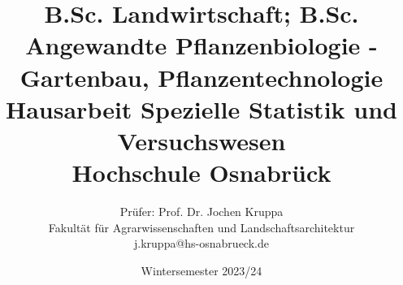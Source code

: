\setlength{\parindent}{0cm}
\usepackage{booktabs}
\usepackage{amsmath}
\usepackage[normalem]{ulem}
\usepackage{hyperref}
\hypersetup{
    colorlinks=true,       %
    linkcolor=black,          %
    urlcolor=magenta           %
}
\renewcommand{\familydefault}{\sfdefault}

\def\examdate{Wintersemester 2023/24}
\def\exammodule{B.Sc. Landwirtschaft; B.Sc. Angewandte Pflanzenbiologie - Gartenbau, Pflanzentechnologie}
\def\lecture{Spezielle Statistik und Versuchswesen}
\def\examtitle{Hausarbeit \lecture}

\title{
\large \exammodule \\[5Ex]
\Huge \examtitle \\[2Ex] 
\Large Hochschule Osnabr{\"u}ck
}
\author{Pr{\"u}fer: Prof. Dr. Jochen Kruppa \\
Fakult{\"a}t f{\"u}r Agrarwissenschaften und Landschaftsarchitektur \\ 
j.kruppa@hs-osnabrueck.de}
\date{\examdate}